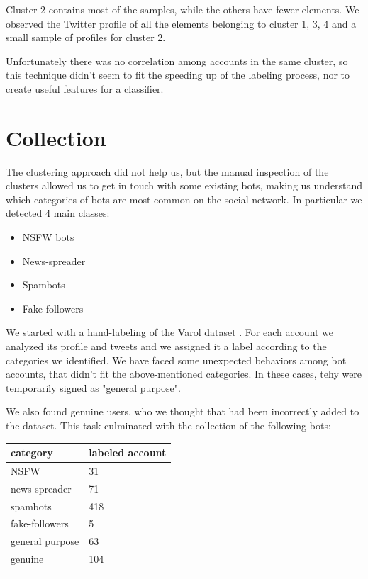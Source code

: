 Cluster 2 contains most of the samples, while the others have fewer elements.
We observed the Twitter profile of all the elements belonging to cluster 1, 3, 4 and a small sample of profiles for cluster 2.

Unfortunately there was no correlation among accounts in the same cluster, so this technique didn't seem to fit the speeding up of the labeling process, nor to create useful features for a classifier.

\section{Collection}
\label{sec:dataset}
The clustering approach did not help us, but the manual inspection of the clusters allowed us to get in touch with some existing bots, making us understand which categories of bots are most common on the social network. In particular we detected 4 main classes:
\begin{itemize}
	\item[\PencilRight]NSFW bots
	\item[\PencilRight]News-spreader
	\item[\PencilRight]Spambots
	\item[\PencilRight]Fake-followers
\end{itemize}

We started with a hand-labeling of the Varol dataset \cite{Varol}. For each account we analyzed its profile and tweets and we assigned it a label according to the categories we identified.  We have faced some unexpected behaviors among bot accounts, that didn't fit the above-mentioned categories. In these cases, tehy were temporarily signed as "general purpose".

We also found genuine users, who we thought that had been incorrectly added to the dataset.
This task culminated with the collection of the following bots:

\begin{center}
	\begin{tabular}{ll}
		\\category&labeled account\\
		\hline\hline
		NSFW&31\\
		news-spreader&71\\
		spambots&418\\
		fake-followers&5\\
		general purpose&63\\
		genuine&104\\\hline\\		
	\end{tabular}
\end{center}

